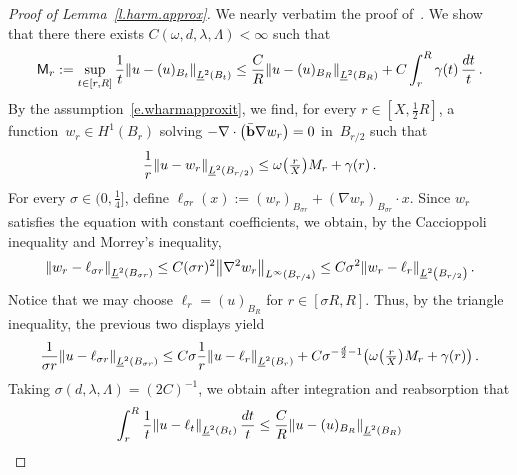 \documentclass[11pt]{article} %
\numberwithin{equation}{section}
\theoremstyle{definition}
\let\originalleft\left
\let\originalright\right
\renewcommand{\left}{\mathopen{}\mathclose\bgroup\originalleft}
\renewcommand{\right}{\aftergroup\egroup\originalright}
\newcommand{\bhom}{\bar{\mathbf{b}}}
\begin{document}
\begin{proof}[{Proof of Lemma~\ref{l.harm.approx}}]
We nearly verbatim the proof of~\cite[Lemma 3.4]{AKMBook}. We show that there there exists $C(\omega,d,\lambda,\Lambda)<\infty$ such that
\begin{align} \label{e.harm.approx.goal}
\mathsf{M}_r 
:= 
\sup_{t \in [r,R]}  \frac 1t \left\| u- (u)_{B_t} \right\|_{\underline{L}^2 \left( B_{t} \right)} 
\leq 
\frac CR \left\| u- (u)_{B_R} \right\|_{\underline{L}^2 \left( B_{R} \right)}  
+
C \int_{ r}^{R}  \gamma(t) \, \frac{dt}{t} 
\,.
\end{align}
By the assumption~\eqref{e.wharmapproxit}, we find, for every $r  \in [X, \tfrac12 R]$, a function~$w_r \in H^1(B_{r})$ solving $-\nabla \cdot \left( \bhom \nabla w_r \right) = 0$ in~$B_{r/2}$ such that 
\begin{equation} 
\label{e.wharmapproxit.applied}
\frac1r \left\| u - w_r \right\|_{\underline{L}^2(B_{r/2})} \leq    
\omega\bigl( \tfrac{r}X \bigr) M_r + \gamma(r)
\,. 
\end{equation}
For every $\sigma \in (0,\tfrac14]$, define $\ell_{\sigma r}(x) := (w_r)_{B_{\sigma r}} + (\nabla w_r)_{B_{\sigma r}} \cdot x $.
Since $w_r$ satisfies the equation with constant coefficients, we obtain, by the Caccioppoli inequality and Morrey's inequality, 
\begin{equation*}  
\left\| w_r - \ell_{\sigma r} \right\|_{\underline{L}^2 \left( B_{ \sigma r} \right)} 
\leq 
C(\sigma r)^2 \left\| \nabla^2 w_r \right\|_{L^{\infty}(B_{r/4})}
\leq
C\sigma^2 \left\| w_r - \ell_{r} \right\|_{\underline{L}^2 \left( B_{r/2} \right)} 
\,.
\end{equation*}
Notice that we may choose $\ell_r = (u)_{B_R}$ for $r \in [\sigma R,R]$. 
Thus, by the triangle inequality, the previous two displays yield 
\begin{equation*}  
\frac1{\sigma r}\left\| u - \ell_{\sigma r} \right\|_{\underline{L}^2 \left( B_{ \sigma r} \right)} 
\leq
C\sigma \frac 1r \left\| u- \ell_r \right\|_{\underline{L}^2 \left( B_{r} \right)} 
+
C\sigma^{-\frac d2 - 1} \left(  \omega \bigl( \tfrac{r}X \bigr)  M_r + \gamma(r)\right)
\,.
\end{equation*}
Taking $\sigma(d,\lambda,\Lambda) = (2C)^{-1}$, we obtain after integration and reabsorption that 
\begin{equation*}  
\int_{r}^{R} 
\frac1{t} \left\| u - \ell_{t} \right\|_{\underline{L}^2 \left( B_{ t} \right)} \, \frac{dt}{t}
\leq 
\frac CR \left\| u- (u)_{B_R} \right\|_{\underline{L}^2 \left( B_{R} \right)}   

\end{equation*}
\end{proof}
\end{document}
